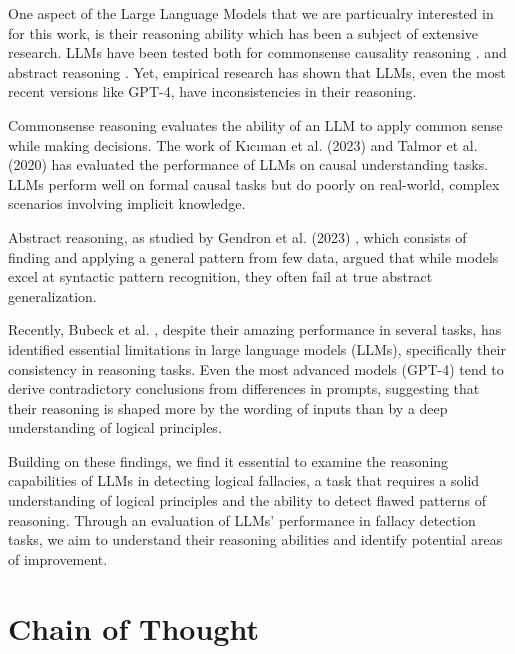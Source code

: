 One aspect of the Large Language Models that we are particualry interested in for this work, is their reasoning ability which has been a subject of extensive research. LLMs have been tested both for commonsense causality reasoning \cite{kıcıman2024causalreasoninglargelanguage}.
and abstract reasoning \cite{gendron2023large}. 
Yet, empirical research \cite{bubeck2023sparksartificialgeneralintelligence} has shown that LLMs, even the most recent versions like GPT-4, have inconsistencies in their reasoning.
\par

Commonsense reasoning evaluates the ability of an LLM to apply common sense while making decisions. The work of Kıcıman et al. (2023) \cite{kıcıman2024causalreasoninglargelanguage} and Talmor et al. (2020) \cite{talmor2022commonsenseqa20exposinglimits} has evaluated the performance of LLMs on causal understanding tasks. LLMs perform well on formal causal tasks but do poorly on real-world, complex scenarios involving implicit knowledge.
\par
Abstract reasoning, as studied by Gendron et al. (2023) \cite{gendron2023large} , which consists of finding and applying a general pattern from few data, argued that while models excel at syntactic pattern recognition, they often fail at true abstract generalization.
\par
Recently, Bubeck et al. \cite{bubeck2023sparksartificialgeneralintelligence}, despite their amazing performance in several tasks, has identified essential limitations in large language models (LLMs), specifically their consistency in reasoning tasks. Even the most advanced models (GPT-4) tend to derive contradictory conclusions from differences in prompts, suggesting that their reasoning is shaped more by the wording of inputs than by a deep understanding of logical principles.
\par
Building on these findings, we find it essential to examine the reasoning capabilities of LLMs in detecting logical fallacies, a task that requires a solid understanding of logical principles and the ability to detect flawed patterns of reasoning. Through an evaluation of LLMs' performance in fallacy detection tasks, we aim to understand their reasoning abilities and identify potential areas of improvement.
\par

\section{Chain of Thought}

